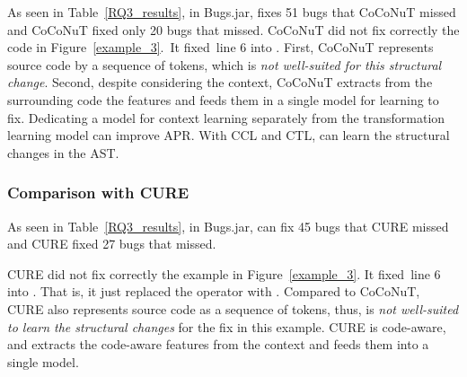 As seen in Table~\ref{RQ3_results}, in Bugs\-.jar, {\tool} fixes 51
bugs that CoCoNuT missed and CoCoNuT fixed only 20 bugs that {\tool}
missed.
CoCoNuT did not fix correctly the code in Figure~\ref{example_3}.~It
fixed~line 6 into   
 \code{());}. First, CoCoNuT represents source code by
a sequence of tokens, which is {\em not well-suited for this
  structural change}. Second, despite considering the context, CoCoNuT
extracts from the surrounding code the features and feeds them in a
single model for learning to fix.
%
Dedicating a model for context learning separately
from the transformation learning model can improve APR.
With CCL and CTL, {\tool} can learn the structural changes in the AST.

\subsubsection{\bf Comparison with CURE}

As seen in Table~\ref{RQ3_results}, in Bugs.jar, {\tool} can fix 45
bugs that CURE missed and CURE fixed 27 bugs that {\tool} missed.

CURE did not fix correctly the example in Figure~\ref{example_3}. It
fixed~line 6 into 
  \code{/} .
That is, it just replaced the operator \code{\%} with \code{/}.
Compared to CoCoNuT, CURE also represents source code as a sequence of
tokens, thus, is {\em not well-suited to learn the structural changes} for
the fix in this example. CURE is code-aware,
and extracts the code-aware features from the context and feeds them
into a single model.

